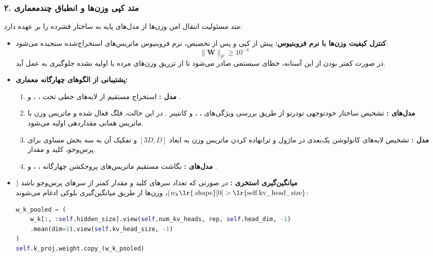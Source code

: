 \subsubsection*{۲. متد کپی وزن‌ها و انطباق چندمعماری }
متد  مسئولیت انتقال امن وزن‌ها از مدل‌های پایه به ساختار فشرده را بر عهده دارد:
\begin{itemize}
    \item \textbf{کنترل کیفیت وزن‌ها با نرم فروبنیوس:} پیش از کپی و پس از تخصیص، نرم فروبنیوس ماتریس‌های استخراج‌شده سنجیده می‌شود:
    \begin{equation}
    \|\mathbf{W}\|_F \ge 10^{-4}
    \end{equation}
    در صورت کمتر بودن از این آستانه، خطای سیستمی  صادر می‌شود تا از تزریق وزن‌های مرده یا اولیه نشده جلوگیری به عمل آید.
    \item \textbf{پشتیبانی از الگوهای چهارگانه معماری:}
    \begin{enumerate}
        \item \textbf{مدل :} استخراج مستقیم از لایه‌های خطی تخت ، ،  و .
        \item \textbf{مدل‌های :} تشخیص ساختار خودتوجهی تودرتو  از طریق بررسی ویژگی‌های ، ،  و کانتینر . در این حالت، فلگ  فعال شده و ماتریس وزن  با ماتریس همانی مقداردهی اولیه می‌شود.
        \item \textbf{مدل :} تشخیص لایه‌های کانولوشن یک‌بعدی  در ماژول  و ترانهاده کردن ماتریس وزن به ابعاد $[3D, D]$ و تفکیک آن به سه بخش مساوی برای پرس‌وجو، کلید و مقدار.
        \item \textbf{مدل‌های :} نگاشت مستقیم ماتریس‌های پروجکشن چهارگانه ، ،  و .
    \end{enumerate}
    \item \textbf{میانگین‌گیری استخری :} در صورتی که تعداد سرهای کلید و مقدار کمتر از سرهای پرس‌وجو باشد ($w_k\text{\lr{.shape}}[0] > \text{\lr{self.kv\_head\_size}}$)، وزن‌ها از طریق میانگین‌گیری بلوکی ادغام می‌شوند:
    \begin{lstlisting}[language=Python]
w_k_pooled = (
    w_k[:, :self.hidden_size].view(self.num_kv_heads, rep, self.head_dim, -1)
    .mean(dim=1).view(self.kv_head_size, -1)
)
self.k_proj.weight.copy_(w_k_pooled)
    \end{lstlisting}
\end{itemize}

